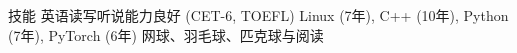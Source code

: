 
\begin{rubric}{技能}
\entry*[语言能力]
	英语读写听说能力良好 (CET-6, TOEFL)
	Linux (7年), C++ (10年), Python (7年), PyTorch (6年)
	网球、羽毛球、匹克球与阅读
\end{rubric}
